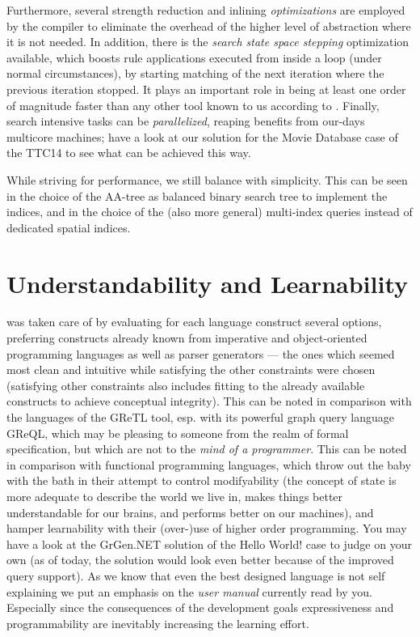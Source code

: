 Furthermore, several strength reduction and inlining \emph{optimizations} are employed by the compiler to eliminate the overhead of the higher level of abstraction where it is not needed.
In addition, there is the \emph{search state space stepping} optimization available, 
which boosts rule applications executed from inside a loop (under normal circumstances), by starting matching of the next iteration where the previous iteration stopped.
It plays an important role in being at least one order of magnitude faster than any other tool known to us according to \cite{varro_bench}.
Finally, search intensive tasks can be \emph{parallelized}, reaping benefits from our-days multicore machines; have a look at our solution for the Movie Database case of the TTC14\cite{MovieDatabase} to see what can be achieved this way.

While striving for performance, we still balance with simplicity.
This can be seen in the choice of the AA-tree\cite{Andersson93balancedsearch} as balanced binary search tree to implement the indices, and in the choice of the (also more general) multi-index queries instead of dedicated spatial indices.

\section{Understandability and Learnability}
was taken care of by evaluating for each language construct several options,
preferring constructs already known from imperative and object-oriented programming languages as well as parser generators ---
the ones which seemed most clean and intuitive while satisfying the other constraints were chosen (satisfying other constraints also includes fitting to the already available constructs to achieve conceptual integrity).
This can be noted in comparison with the languages of the GReTL \cite{GReTL} tool, esp. with its powerful graph query language GReQL,
which may be pleasing to someone from the realm of formal specification, but which are not to the \emph{mind of a programmer}.
This can be noted in comparison with functional programming languages, which throw out the baby with the bath in their attempt to control modifyability (the concept of state is more adequate to describe the world we live in, makes things better understandable for our brains, and performs better on our machines), and hamper learnability with their (over-)use of higher order programming.
You may have a look at the GrGen.NET solution of the Hello World! case \cite{HelloWorld} to judge on your own (as of today, the solution would look even better because of the improved query support).
As we know that even the best designed language is not self explaining we put an emphasis on the \emph{user manual} currently read by you.
Especially since the consequences of the development goals expressiveness and programmability are inevitably increasing the learning effort.


